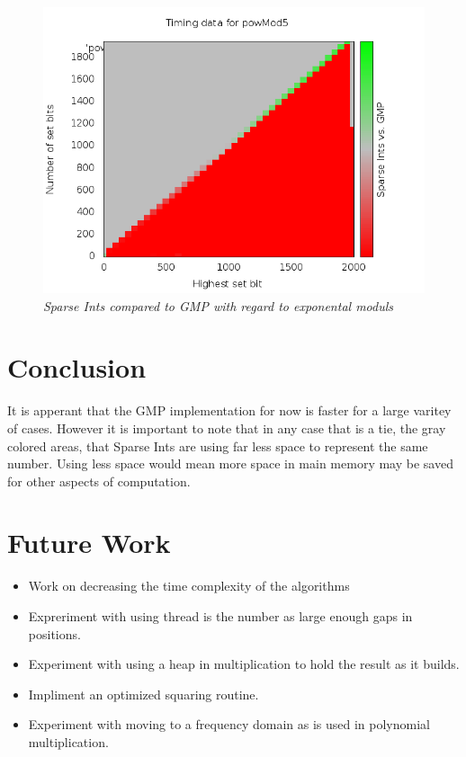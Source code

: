 \documentclass[letterpaper,11pt]{article}
\begin{document}
\begin{figure}  
\begin{center}  
\includegraphics[width=.8\textwidth]{../plots/powMod50num50high3test.png}  
\caption{\small \sl Sparse Ints compared to GMP with regard to exponental moduls\label{fig:PowMod}}  
\end{center}  
\end{figure} 

\restoregeometry

\section{Conclusion}
It is apperant that the GMP implementation for now is faster for a large varitey of cases. 
However it is important to note that in any case that is a tie, the gray colored areas, that Sparse Ints are 
using far less space to represent the same number. Using less space would mean more space in main memory may be saved for other aspects of
computation. 
\section{Future Work}
\begin{itemize}
    \item Work on decreasing the time complexity of the algorithms
    \item Expreriment with using thread is the number as large enough gaps in positions.
    \item Experiment with using a heap in multiplication to hold the result as it builds.
    \item Impliment an optimized squaring routine.
    \item Experiment with moving to a frequency domain as is used in polynomial multiplication.
\end{itemize}



\end{document}

